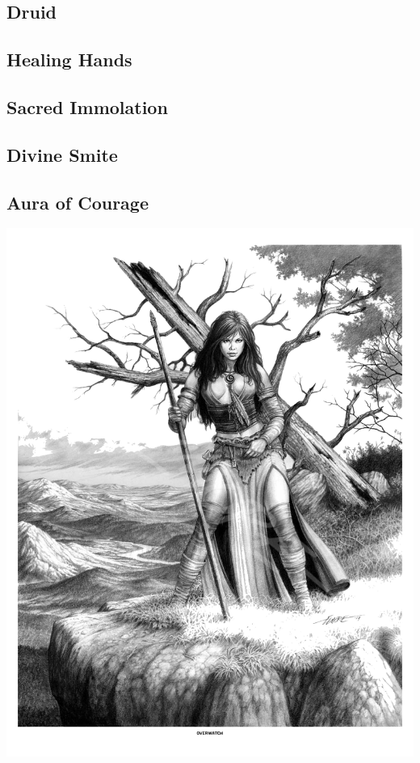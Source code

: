 
\begin{multicols*}{2}

\section{Druid}

\subsection*{Healing Hands}

\subsection*{Sacred Immolation}

\subsection*{Divine Smite}

\subsection*{Aura of Courage}

\begin{Figure}
\centering
\includegraphics[width=\textwidth]{img/druid-2.png}
\end{Figure}
    
\end{multicols*}

    